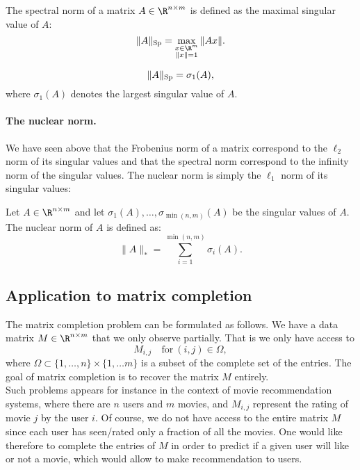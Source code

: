 \documentclass[11pt,nocut]{article}
\begin{document}
\begin{definition}
	The spectral norm of a matrix $A \in \R^{n \times m}$ is defined as the maximal singular value of $A$:
	$$
	\|A\|_{\rm Sp} = \max_{\substack{x \in \R^m \\ \|x\|=1}} \|Ax\|.
	$$
\end{definition}
\begin{proposition}
	$$
	\|A\|_{\rm Sp} = \sigma_1(A),
	$$
	where $\sigma_1(A)$ denotes the largest singular value of $A$.
\end{proposition}

\paragraph{The nuclear norm.} We have seen above that the Frobenius norm of a matrix correspond to the $\ell_2$ norm of its singular values and that the spectral norm correspond to the infinity norm of the singular values. The nuclear norm is simply the $\ell_1$ norm of its singular values:
\begin{definition}
	Let $A \in \R^{n \times m}$ and let $\sigma_1(A), \dots, \sigma_{\min(n,m)}(A)$ be the singular values of $A$. The nuclear norm of $A$ is defined as:
	$$
	\|A\|_* = \sum_{i=1}^{\min(n,m)} \sigma_i(A).
	$$
	
\end{definition}

\subsection{Application to matrix completion}

The matrix completion problem can be formulated as follows.
We have a data matrix $M \in \R^{n \times m}$ that we only observe partially. That is we only have access to 
$$
M_{i,j} \quad \text{for} \ (i,j) \in \Omega,
$$
where $\Omega \subset \{1, \dots, n\} \times \{1, \dots m\}$ is a subset of the complete set of the entries.
The goal of matrix completion is to recover the matrix $M$ entirely.
\\

Such problems appears for instance in the context of movie recommendation systems, where there are $n$ users and $m$ movies, and $M_{i,j}$ represent the rating of movie $j$ by the user $i$. Of course, we do not have access to the entire matrix $M$ since each user has seen/rated only a fraction of all the movies. 
One would like therefore to complete the entries of $M$ in order to predict if a given user will like or not a movie, which would allow to make recommendation to users.
\\
\end{document}
